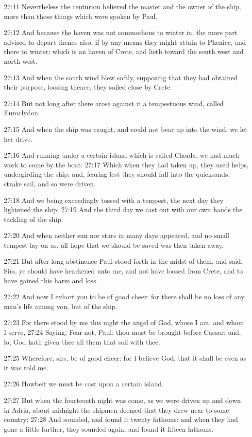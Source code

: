 27:11 Nevertheless the centurion believed the master and the owner of
the ship, more than those things which were spoken by Paul.

27:12 And because the haven was not commodious to winter in, the more
part advised to depart thence also, if by any means they might attain
to Phenice, and there to winter; which is an haven of Crete, and lieth
toward the south west and north west.

27:13 And when the south wind blew softly, supposing that they had
obtained their purpose, loosing thence, they sailed close by Crete.

27:14 But not long after there arose against it a tempestuous wind,
called Euroclydon.

27:15 And when the ship was caught, and could not bear up into the
wind, we let her drive.

27:16 And running under a certain island which is called Clauda, we
had much work to come by the boat: 27:17 Which when they had taken up,
they used helps, undergirding the ship; and, fearing lest they should
fall into the quicksands, strake sail, and so were driven.

27:18 And we being exceedingly tossed with a tempest, the next day
they lightened the ship; 27:19 And the third day we cast out with our
own hands the tackling of the ship.

27:20 And when neither sun nor stars in many days appeared, and no
small tempest lay on us, all hope that we should be saved was then
taken away.

27:21 But after long abstinence Paul stood forth in the midst of them,
and said, Sirs, ye should have hearkened unto me, and not have loosed
from Crete, and to have gained this harm and loss.

27:22 And now I exhort you to be of good cheer: for there shall be no
loss of any man's life among you, but of the ship.

27:23 For there stood by me this night the angel of God, whose I am,
and whom I serve, 27:24 Saying, Fear not, Paul; thou must be brought
before Caesar: and, lo, God hath given thee all them that sail with
thee.

27:25 Wherefore, sirs, be of good cheer: for I believe God, that it
shall be even as it was told me.

27:26 Howbeit we must be cast upon a certain island.

27:27 But when the fourteenth night was come, as we were driven up and
down in Adria, about midnight the shipmen deemed that they drew near
to some country; 27:28 And sounded, and found it twenty fathoms: and
when they had gone a little further, they sounded again, and found it
fifteen fathoms.

